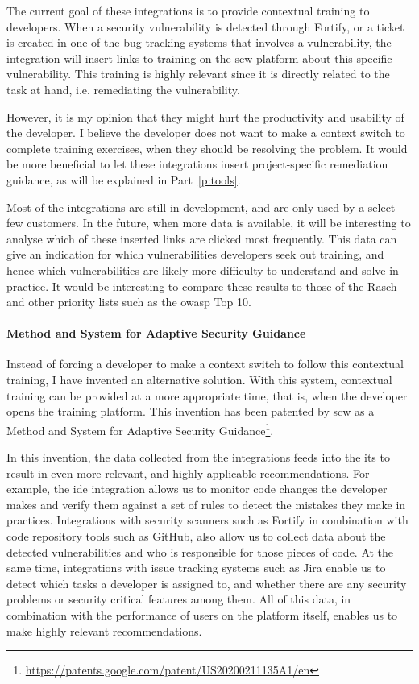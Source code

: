 The current goal of these integrations is to provide contextual training to developers.
When a security vulnerability is detected through Fortify, or a ticket is created in one of the bug tracking systems that involves a vulnerability, the integration will insert links to training on the \gls{scw} platform about this specific vulnerability.
This training is highly relevant since it is directly related to the task at hand, i.e. remediating the vulnerability.

However, it is my opinion that they might hurt the productivity and usability of the developer.
I believe the developer does not want to make a context switch to complete training exercises, when they should be resolving the problem.
It would be more beneficial to let these integrations insert project-specific remediation guidance, as will be explained in Part~\ref{p:tools}.

Most of the integrations are still in development, and are only used by a select few customers.
In the future, when more data is available, it will be interesting to analyse which of these inserted links are clicked most frequently.
This data can give an indication for which vulnerabilities developers seek out training, and hence which vulnerabilities are likely more difficulty to understand and solve in practice.
It would be interesting to compare these results to those of the Rasch and other priority lists such as the \gls{owasp} Top 10.

\paragraph{Method and System for Adaptive Security Guidance}
Instead of forcing a developer to make a context switch to follow this contextual training, I have invented an alternative solution.
With this system, contextual training can be provided at a more appropriate time, that is, when the developer opens the training platform.
This invention has been patented by \gls{scw} as a Method and System for Adaptive Security Guidance\footnote{\url{https://patents.google.com/patent/US20200211135A1/en}}.

In this invention, the data collected from the integrations feeds into the \gls{its} to result in even more relevant, and highly applicable recommendations.
For example, the \gls{ide} integration allows us to monitor code changes the developer makes and verify them against a set of rules to detect the mistakes they make in practices.
Integrations with security scanners such as Fortify in combination with code repository tools such as GitHub, also allow us to collect data about the detected vulnerabilities and who is responsible for those pieces of code.
At the same time, integrations with issue tracking systems such as Jira enable us to detect which tasks a developer is assigned to, and whether there are any security problems or security critical features among them.
All of this data, in combination with the performance of users on the platform itself, enables us to make highly relevant recommendations.

